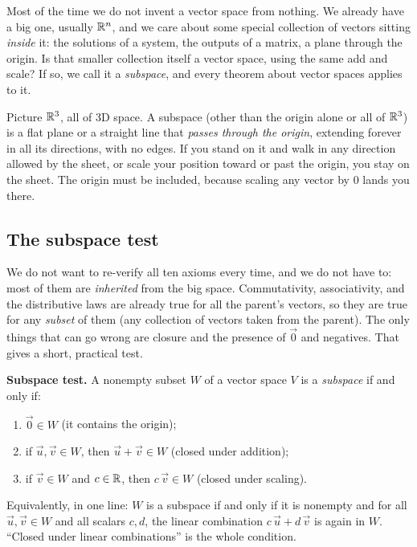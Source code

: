 Most of the time we do not invent a vector space from nothing. We already have a big one,
usually $\mathbb{R}^n$, and we care about some special collection of vectors sitting
\emph{inside} it: the solutions of a system, the outputs of a matrix, a plane through the
origin. Is that smaller collection itself a vector space, using the same
add and scale? If so, we call it a \emph{subspace}, and every theorem about vector spaces
applies to it.

\begin{intuitionbox}
Picture $\mathbb{R}^3$, all of $3$D space. A subspace (other than the origin alone or all of
$\mathbb{R}^3$) is a flat plane or a
straight line that \emph{passes through the origin}, extending forever in all its
directions, with no edges. If you stand on it and walk in any
direction allowed by the sheet, or scale your position toward or past the origin, you stay
on the sheet. The origin must be included, because scaling any vector by $0$ lands you
there.
\end{intuitionbox}

\subsection{The subspace test}

We do not want to re-verify all ten axioms every time, and we do not have to: most of
them are \emph{inherited} from the big space. Commutativity, associativity, and the
distributive laws are already true for all the parent's vectors, so they are true for any
\emph{subset} of them (any collection of vectors taken from the parent). The only things
that can go wrong are closure and the presence of $\vec{0}$
and negatives. That gives a short, practical test.

\begin{formalbox}
\textbf{Subspace test.} A nonempty subset $W$ of a vector space $V$ is a \emph{subspace}
if and only if:
\begin{enumerate}[label=(\alph*)]
  \item $\vec{0} \in W$ \hfill (it contains the origin);
  \item if $\vec{u},\vec{v}\in W$, then $\vec{u}+\vec{v}\in W$ \hfill (closed under addition);
  \item if $\vec{v}\in W$ and $c\in\mathbb{R}$, then $c\,\vec{v}\in W$ \hfill (closed under scaling).
\end{enumerate}
Equivalently, in one line: $W$ is a subspace if and only if it is nonempty and for all
$\vec{u},\vec{v}\in W$ and all scalars $c,d$, the linear combination
$c\,\vec{u} + d\,\vec{v}$ is again in $W$. ``Closed under linear combinations'' is the
whole condition.
\end{formalbox}

